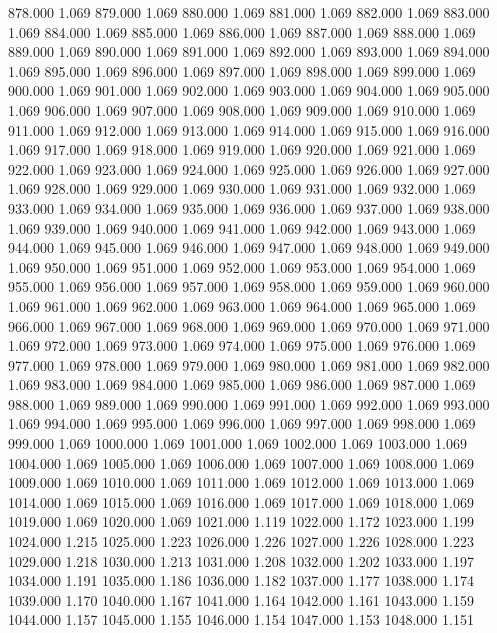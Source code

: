 878.000 1.069 
879.000 1.069 
880.000 1.069 
881.000 1.069 
882.000 1.069 
883.000 1.069 
884.000 1.069 
885.000 1.069 
886.000 1.069 
887.000 1.069 
888.000 1.069 
889.000 1.069 
890.000 1.069 
891.000 1.069 
892.000 1.069 
893.000 1.069 
894.000 1.069 
895.000 1.069 
896.000 1.069 
897.000 1.069 
898.000 1.069 
899.000 1.069 
900.000 1.069 
901.000 1.069 
902.000 1.069 
903.000 1.069 
904.000 1.069 
905.000 1.069 
906.000 1.069 
907.000 1.069 
908.000 1.069 
909.000 1.069 
910.000 1.069 
911.000 1.069 
912.000 1.069 
913.000 1.069 
914.000 1.069 
915.000 1.069 
916.000 1.069 
917.000 1.069 
918.000 1.069 
919.000 1.069 
920.000 1.069 
921.000 1.069 
922.000 1.069 
923.000 1.069 
924.000 1.069 
925.000 1.069 
926.000 1.069 
927.000 1.069 
928.000 1.069 
929.000 1.069 
930.000 1.069 
931.000 1.069 
932.000 1.069 
933.000 1.069 
934.000 1.069 
935.000 1.069 
936.000 1.069 
937.000 1.069 
938.000 1.069 
939.000 1.069 
940.000 1.069 
941.000 1.069 
942.000 1.069 
943.000 1.069 
944.000 1.069 
945.000 1.069 
946.000 1.069 
947.000 1.069 
948.000 1.069 
949.000 1.069 
950.000 1.069 
951.000 1.069 
952.000 1.069 
953.000 1.069 
954.000 1.069 
955.000 1.069 
956.000 1.069 
957.000 1.069 
958.000 1.069 
959.000 1.069 
960.000 1.069 
961.000 1.069 
962.000 1.069 
963.000 1.069 
964.000 1.069 
965.000 1.069 
966.000 1.069 
967.000 1.069 
968.000 1.069 
969.000 1.069 
970.000 1.069 
971.000 1.069 
972.000 1.069 
973.000 1.069 
974.000 1.069 
975.000 1.069 
976.000 1.069 
977.000 1.069 
978.000 1.069 
979.000 1.069 
980.000 1.069 
981.000 1.069 
982.000 1.069 
983.000 1.069 
984.000 1.069 
985.000 1.069 
986.000 1.069 
987.000 1.069 
988.000 1.069 
989.000 1.069 
990.000 1.069 
991.000 1.069 
992.000 1.069 
993.000 1.069 
994.000 1.069 
995.000 1.069 
996.000 1.069 
997.000 1.069 
998.000 1.069 
999.000 1.069 
1000.000 1.069 
1001.000 1.069 
1002.000 1.069 
1003.000 1.069 
1004.000 1.069 
1005.000 1.069 
1006.000 1.069 
1007.000 1.069 
1008.000 1.069 
1009.000 1.069 
1010.000 1.069 
1011.000 1.069 
1012.000 1.069 
1013.000 1.069 
1014.000 1.069 
1015.000 1.069 
1016.000 1.069 
1017.000 1.069 
1018.000 1.069 
1019.000 1.069 
1020.000 1.069 
1021.000 1.119 
1022.000 1.172 
1023.000 1.199 
1024.000 1.215 
1025.000 1.223 
1026.000 1.226 
1027.000 1.226 
1028.000 1.223 
1029.000 1.218 
1030.000 1.213 
1031.000 1.208 
1032.000 1.202 
1033.000 1.197 
1034.000 1.191 
1035.000 1.186 
1036.000 1.182 
1037.000 1.177 
1038.000 1.174 
1039.000 1.170 
1040.000 1.167 
1041.000 1.164 
1042.000 1.161 
1043.000 1.159 
1044.000 1.157 
1045.000 1.155 
1046.000 1.154 
1047.000 1.153 
1048.000 1.151 
